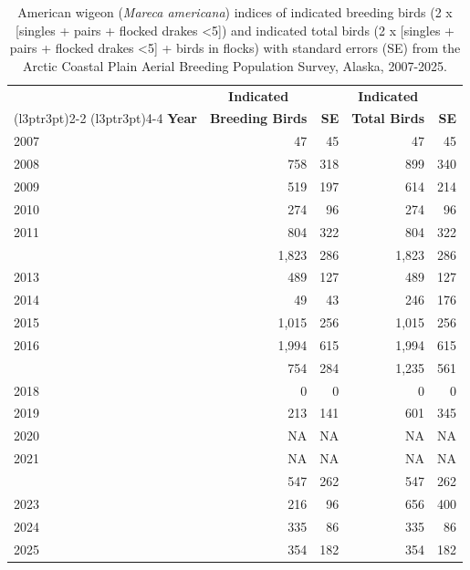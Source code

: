 \documentclass[
]{article}
\begin{document}
\begin{longtable}[t]{lrrrr}

\caption{\label{tbl-AMWI}American wigeon (\emph{Mareca americana})
indices of indicated breeding birds (2 x {[}singles + pairs + flocked
drakes \textless5{]}) and indicated total birds (2 x {[}singles + pairs
+ flocked drakes \textless5{]} + birds in flocks) with standard errors
(SE) from the Arctic Coastal Plain Aerial Breeding Population Survey,
Alaska, 2007-2025.}

\tabularnewline

\\
\toprule
\multicolumn{1}{c}{\textbf{ }} & \multicolumn{1}{c}{\textbf{Indicated}} & \multicolumn{1}{c}{\textbf{ }} & \multicolumn{1}{c}{\textbf{Indicated}} & \multicolumn{1}{c}{\textbf{ }} \\
\cmidrule(l{3pt}r{3pt}){2-2} \cmidrule(l{3pt}r{3pt}){4-4}
\textbf{Year} & \textbf{Breeding Birds} & \textbf{SE} & \textbf{Total Birds} & \textbf{SE}\\
\midrule
2007 & 47 & 45 & 47 & 45\\
2008 & 758 & 318 & 899 & 340\\
2009 & 519 & 197 & 614 & 214\\
2010 & 274 & 96 & 274 & 96\\
2011 & 804 & 322 & 804 & 322\\
\addlinespace
2012 & 1,823 & 286 & 1,823 & 286\\
2013 & 489 & 127 & 489 & 127\\
2014 & 49 & 43 & 246 & 176\\
2015 & 1,015 & 256 & 1,015 & 256\\
2016 & 1,994 & 615 & 1,994 & 615\\
\addlinespace
2017 & 754 & 284 & 1,235 & 561\\
2018 & 0 & 0 & 0 & 0\\
2019 & 213 & 141 & 601 & 345\\
2020 & NA & NA & NA & NA\\
2021 & NA & NA & NA & NA\\
\addlinespace
2022 & 547 & 262 & 547 & 262\\
2023 & 216 & 96 & 656 & 400\\
2024 & 335 & 86 & 335 & 86\\
2025 & 354 & 182 & 354 & 182\\
\bottomrule

\end{longtable}

\endgroup{}
\end{document}
